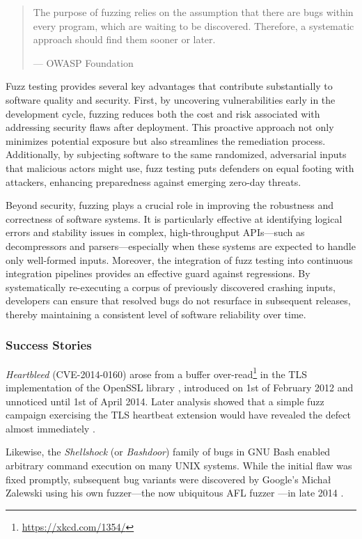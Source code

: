\documentclass[
  a4paper,
]{scrreprt}
\theoremstyle{definition}
\theoremstyle{remark}
\begin{document}
\begin{quote}
The purpose of fuzzing relies on the assumption that there are bugs
within every program, which are waiting to be discovered. Therefore, a
systematic approach should find them sooner or later.

--- OWASP Foundation \autocite{owaspfoundation}
\end{quote}

Fuzz testing provides several key advantages that contribute
substantially to software quality and security. First, by uncovering
vulnerabilities early in the development cycle, fuzzing reduces both the
cost and risk associated with addressing security flaws after
deployment. This proactive approach not only minimizes potential
exposure but also streamlines the remediation process. Additionally, by
subjecting software to the same randomized, adversarial inputs that
malicious actors might use, fuzz testing puts defenders on equal footing
with attackers, enhancing preparedness against emerging zero-day
threats.

Beyond security, fuzzing plays a crucial role in improving the
robustness and correctness of software systems. It is particularly
effective at identifying logical errors and stability issues in complex,
high-throughput APIs---such as decompressors and parsers---especially
when these systems are expected to handle only well-formed inputs.
Moreover, the integration of fuzz testing into continuous integration
pipelines provides an effective guard against regressions. By
systematically re-executing a corpus of previously discovered crashing
inputs, developers can ensure that resolved bugs do not resurface in
subsequent releases, thereby maintaining a consistent level of software
reliability over time.

\subsubsection{Success Stories}\label{success-stories}

\emph{Heartbleed} (CVE-2014-0160) \autocite{heartbleed,heartbleed-cve}
arose from a buffer over-read\footnote{\url{https://xkcd.com/1354/}} in
the TLS implementation of the OpenSSL library
\autocite{theopensslproject2025}, introduced on 1st of February 2012 and
unnoticed until 1st of April 2014. Later analysis showed that a simple
fuzz campaign exercising the TLS heartbeat extension would have revealed
the defect almost immediately \autocite{wheeler2014}.

Likewise, the \emph{Shellshock} (or \emph{Bashdoor}) family of bugs in
GNU Bash \autocite{bash} enabled arbitrary command execution on many
UNIX systems. While the initial flaw was fixed promptly, subsequent bug
variants were discovered by Google's Michał Zalewski using his own
fuzzer---the now ubiquitous AFL fuzzer \autocite{afl}---in late 2014
\autocite{saarinen2014}.
\end{document}

